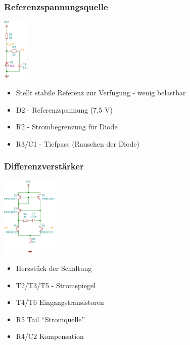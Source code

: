 \documentclass[aspectratio=32]{beamer}
\begin{document}
\begin{frame}
  \frametitle{Referenzspannungsquelle}
  \centering
  \includegraphics[height=3cm]{../common/Simulation/ref.pdf}
  \begin{itemize}
    \item Stellt stabile Referenz zur Verfügung - wenig belastbar
    \item D2 - Referenzspannung (7,5 V)
    \item R2 - Strombegrenzung für Diode
    \item R3/C1 - Tiefpass (Rauschen der Diode)
  \end{itemize}
\end{frame}

\begin{frame}
  \frametitle{Differenzverstärker}
  \centering
  \includegraphics[width=0.2\textwidth]{../common/Simulation/diffamp.pdf}
  \begin{itemize}
    \item Herzstück der Schaltung
    \item T2/T3/T5 - Stromspiegel
    \item T4/T6 Eingangstransistoren
    \item R5 Tail ``Stromquelle''
    \item R4/C2 Kompensation
  \end{itemize}
\end{frame}
\end{document}
